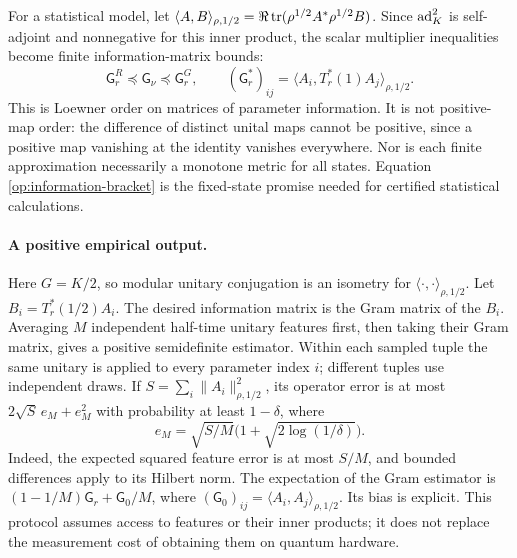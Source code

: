 For a statistical model, let
$\langle A,B\rangle_{\rho,1/2}=\Re\operatorname{tr}(\rho^{1/2}A^*\rho^{1/2}B)$.
Since $\operatorname{ad}_K^2$ is self-adjoint and nonnegative for this inner product,
the scalar multiplier inequalities become finite information-matrix bounds:
\begin{equation}
 \mathsf G_r^R\preceq\mathsf G_\nu\preceq\mathsf G_r^G,
 \qquad
 (\mathsf G_r^*)_{ij}=
 \langle A_i,T_r^*(1)A_j\rangle_{\rho,1/2}.
 \label{op:information-bracket}
\end{equation}
This is Loewner order on matrices of parameter information. It is not
positive-map order: the difference of distinct unital maps cannot be
positive, since a positive map vanishing at the identity vanishes everywhere.
Nor is each finite approximation necessarily a monotone metric for all
states. Equation \eqref{op:information-bracket} is the fixed-state promise
needed for certified statistical calculations.


\paragraph{A positive empirical output.}
Here $G=K/2$, so modular unitary conjugation is an isometry for
$\langle\cdot,\cdot\rangle_{\rho,1/2}$.
Let $B_i=T_r^*(1/2)A_i$. The desired information matrix is the Gram matrix
of the $B_i$. Averaging $M$ independent half-time unitary features first,
then taking their Gram matrix, gives a positive semidefinite estimator.
Within each sampled tuple the same unitary is applied to every parameter
index $i$; different tuples use independent draws.
If $S=\sum_i\|A_i\|_{\rho,1/2}^2$, its operator error is at most
$2\sqrt S\,e_M+e_M^2$ with probability at least $1-\delta$, where
\[
 e_M=\sqrt{S/M}\bigl(1+\sqrt{2\log(1/\delta)}\bigr).
\]
Indeed, the expected squared feature error is at most $S/M$, and bounded
differences apply to its Hilbert norm. The expectation of the Gram estimator
is $(1-1/M)\mathsf G_r+\mathsf G_0/M$, where
$(\mathsf G_0)_{ij}=\langle A_i,A_j\rangle_{\rho,1/2}$. Its bias is explicit. This protocol
assumes access to features or their inner products; it does not replace the
measurement cost of obtaining them on quantum hardware.

